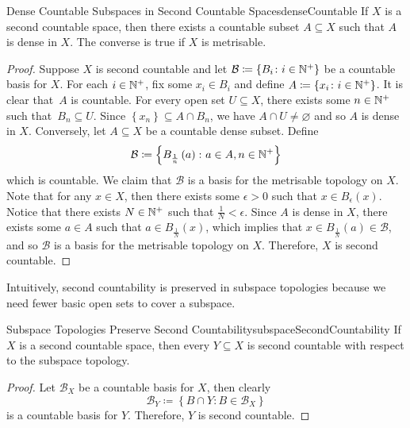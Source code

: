 \documentclass[math]{amznotes}
\theoremstyle{remark}
\begin{document}
\begin{probox}{Dense Countable Subspaces in Second Countable Spaces}{denseCountable}
    If $X$ is a second countable space, then there exists a countable subset $A \subseteq X$ such that $A$ is dense in $X$. The converse is true if $X$ is metrisable.
    \tcblower
    \begin{proof}
        Suppose $X$ is second countable and let $\mathcal{B} \coloneqq \left\{B_i \colon i \in \mathbb{N}^+\right\}$ be a countable basis for $X$. For each $i \in \mathbb{N}^+$, fix some $x_i \in B_i$ and define $A \coloneqq \left\{x_i \colon i \in \mathbb{N}^+\right\}$. It is clear that~$A$ is countable. For every open set $U \subseteq X$, there exists some $n \in \mathbb{N}^+$ such that~$B_n \subseteq U$. Since $\left\{x_n\right\} \subseteq A \cap B_n$, we have $A \cap U \neq \varnothing$ and so $A$ is dense in $X$. Conversely, let $A \subseteq X$ be a countable dense subset. Define
        \begin{equation*}
            \mathcal{B} \coloneqq \left\{B_{\frac{1}{n}}\left(a\right) \colon a \in A, n \in \mathbb{N}^+\right\}
        \end{equation*}
        which is countable. We claim that $\mathcal{B}$ is a basis for the metrisable topology on $X$. Note that for any $x \in X$, then there exists some $\epsilon > 0$ such that $x \in B_{\epsilon}\left(x\right)$. Notice that there exists $N \in \mathbb{N}^+$ such that $\frac{1}{N} < \epsilon$. Since $A$ is dense in $X$, there exists some $a \in A$ such that $a \in B_{\frac{1}{N}}\left(x\right)$, which implies that $x \in B_{\frac{1}{N}}\left(a\right) \in \mathcal{B}$, and so $\mathcal{B}$ is a basis for the metrisable topology on $X$. Therefore, $X$ is second countable.
    \end{proof}
\end{probox}
Intuitively, second countability is preserved in subspace topologies because we need fewer basic open sets to cover a subspace.
\begin{probox}{Subspace Topologies Preserve Second Countability}{subspaceSecondCountability}
    If $X$ is a second countable space, then every $Y \subseteq X$ is second countable with respect to the subspace topology.
    \tcblower
    \begin{proof}
        Let $\mathcal{B}_X$ be a countable basis for $X$, then clearly 
        \begin{equation*}
            \mathcal{B}_Y \coloneqq \left\{B \cap Y \colon B \in \mathcal{B}_{X}\right\}
        \end{equation*}
        is a countable basis for $Y$. Therefore, $Y$ is second countable.
    \end{proof}
\end{probox}
\end{document}
